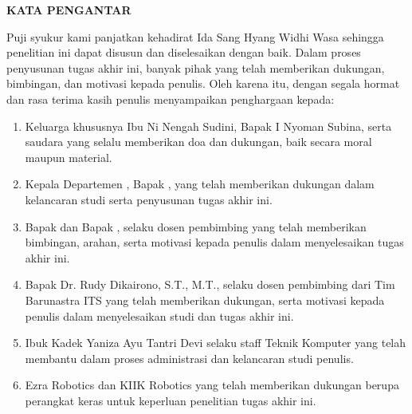 \begin{center}
  \Large
  \textbf{KATA PENGANTAR}
\end{center}


\vspace{2ex}


Puji syukur kami panjatkan kehadirat Ida Sang Hyang Widhi Wasa  sehingga penelitian ini dapat disusun dan diselesaikan dengan baik. Dalam proses penyusunan tugas akhir ini, banyak pihak yang telah memberikan dukungan, bimbingan, dan motivasi kepada penulis. Oleh karena itu, dengan segala hormat dan rasa terima kasih  penulis menyampaikan penghargaan kepada:

\begin{enumerate}[nolistsep]
  \item Keluarga khususnya Ibu Ni Nengah Sudini, Bapak I Nyoman Subina, serta saudara yang selalu memberikan doa dan dukungan, baik secara moral maupun material.
  \item Kepala Departemen \studyprogram{}, Bapak \headofdepartment{}, yang telah memberikan dukungan dalam kelancaran studi serta penyusunan tugas akhir ini.
  \item Bapak \advisor{} dan Bapak \coadvisor{}, selaku dosen pembimbing yang telah memberikan bimbingan, arahan, serta motivasi kepada penulis dalam menyelesaikan tugas akhir ini.
  \item Bapak Dr. Rudy Dikairono, S.T., M.T., selaku dosen pembimbing dari Tim Barunastra ITS yang telah memberikan dukungan, serta motivasi kepada penulis dalam menyelesaikan studi dan tugas akhir ini.
  \item Ibuk Kadek Yaniza Ayu Tantri Devi selaku staff Teknik Komputer yang telah membantu dalam proses administrasi dan kelancaran studi penulis.
  \item Ezra Robotics dan KIIK Robotics yang telah memberikan dukungan berupa perangkat keras untuk keperluan penelitian tugas akhir ini.
\end{enumerate}

